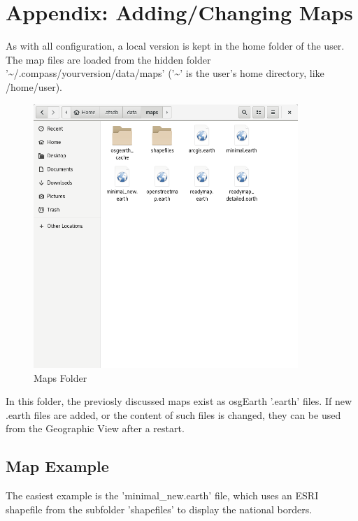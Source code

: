 \section{Appendix: Adding/Changing Maps}
\label{sec:appendix_maps}

As with all configuration, a local version is kept in the home folder of the user. The map files are loaded from the hidden folder '\textasciitilde/.compass/yourversion/data/maps' ('\textasciitilde' is the user's home directory, like /home/user).

\begin{figure}[H]
    \includegraphics[width=10cm,frame]{figures/geoview_maps_config.png}
  \caption{Maps Folder}
\end{figure}

In this folder, the previosly discussed maps exist as osgEarth '.earth' files. If new .earth files are added, or the content of such files is changed, they can be used from the Geographic View after a restart.

\subsection{Map Example}
The easiest example is the 'minimal\_new.earth' file, which uses an ESRI shapefile from the subfolder 'shapefiles' to display the national borders.

